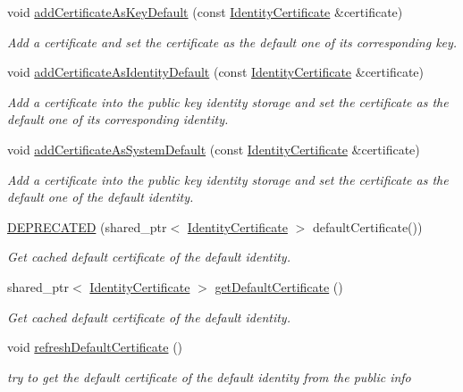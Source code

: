\begin{DoxyCompactItemize}
void \hyperlink{classndn_1_1SecPublicInfo_ad21d523855aa71b705b817cda4c460f6}{add\+Certificate\+As\+Key\+Default} (const \hyperlink{classndn_1_1IdentityCertificate}{Identity\+Certificate} \&certificate)
\begin{DoxyCompactList}\small\item\em Add a certificate and set the certificate as the default one of its corresponding key. \end{DoxyCompactList}\item 
void \hyperlink{classndn_1_1SecPublicInfo_ae25f05be42c7999aaeda1bb5f6f9de7f}{add\+Certificate\+As\+Identity\+Default} (const \hyperlink{classndn_1_1IdentityCertificate}{Identity\+Certificate} \&certificate)
\begin{DoxyCompactList}\small\item\em Add a certificate into the public key identity storage and set the certificate as the default one of its corresponding identity. \end{DoxyCompactList}\item 
void \hyperlink{classndn_1_1SecPublicInfo_a95d37c26dd28dda2a985800208de53f4}{add\+Certificate\+As\+System\+Default} (const \hyperlink{classndn_1_1IdentityCertificate}{Identity\+Certificate} \&certificate)
\begin{DoxyCompactList}\small\item\em Add a certificate into the public key identity storage and set the certificate as the default one of the default identity. \end{DoxyCompactList}\item 
\hyperlink{classndn_1_1SecPublicInfo_aaa46b29c93a85f656a133679e8bb9e01}{D\+E\+P\+R\+E\+C\+A\+T\+ED} (shared\+\_\+ptr$<$ \hyperlink{classndn_1_1IdentityCertificate}{Identity\+Certificate} $>$ default\+Certificate())
\begin{DoxyCompactList}\small\item\em Get cached default certificate of the default identity. \end{DoxyCompactList}\item 
shared\+\_\+ptr$<$ \hyperlink{classndn_1_1IdentityCertificate}{Identity\+Certificate} $>$ \hyperlink{classndn_1_1SecPublicInfo_a1ac95c0915375323530796437a6323c7}{get\+Default\+Certificate} ()
\begin{DoxyCompactList}\small\item\em Get cached default certificate of the default identity. \end{DoxyCompactList}\item 
void \hyperlink{classndn_1_1SecPublicInfo_a153a0a877a7d9a2afa90a597f810a5a8}{refresh\+Default\+Certificate} ()\hypertarget{classndn_1_1SecPublicInfo_a153a0a877a7d9a2afa90a597f810a5a8}{}\label{classndn_1_1SecPublicInfo_a153a0a877a7d9a2afa90a597f810a5a8}

\begin{DoxyCompactList}\small\item\em try to get the default certificate of the default identity from the public info \end{DoxyCompactList}\end{DoxyCompactItemize}

